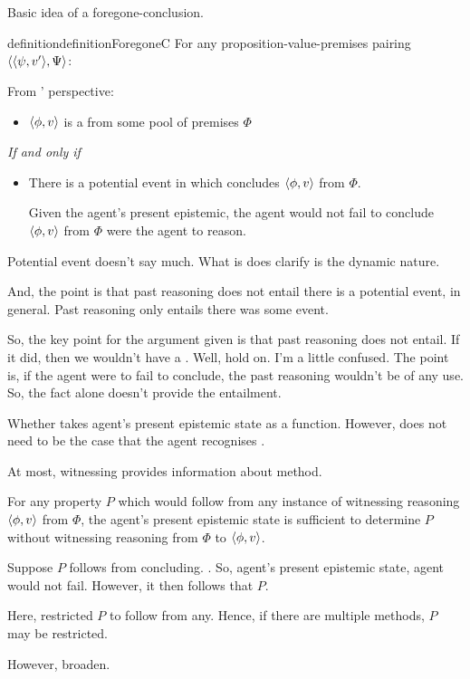 \section{}
\label{cha:fcs:sec:fc}

\begin{note}
  Basic idea of a foregone-conclusion.

  \begin{restatable}{definition}{definitionForegoneC}
    For any proposition-value-premises pairing \(\langle \langle \psi, v' \rangle, \Psi \rangle\):

    From \vAgent{}' perspective:
    \begin{itemize}
    \item
      \(\langle \phi, v \rangle\) is a \emph{} from some pool of premises \(\Phi\)
    \end{itemize}
    \emph{If and only if}
    \begin{itemize}
    \item
      There is a potential event in which \vAgent{} concludes \(\langle \phi, v \rangle\) from \(\Phi\).

      Given the agent's present epistemic, the agent would not fail to conclude \(\langle \phi, v \rangle\) from \(\Phi\) were the agent to reason.
    \end{itemize}
  \end{restatable}

  {
    Potential event doesn't say much.
    What is does clarify is the dynamic nature.

    And, the point is that past reasoning does not entail there is a potential event, in general.
    Past reasoning only entails there was some event.

    So, the key point for the argument given is that past reasoning does not entail.
    If it did, then we wouldn't have a \requ{}.
    Well, hold on.
    I'm a little confused.
    The point is, if the agent were to fail to conclude, the past reasoning wouldn't be of any use.
    So, the fact alone doesn't provide the entailment.
  }

  Whether \fc{} takes agent's present epistemic state as a function.
  However, does not need to be the case that the agent recognises \fc{}.

  At most, witnessing provides information about method.

  For any property \(P\) which would follow from any instance of witnessing reasoning \(\langle \phi, v \rangle\) from \(\Phi\), the agent's present epistemic state is sufficient to determine \(P\) without witnessing reasoning from \(\Phi\) to \(\langle \phi, v \rangle\).

  Suppose \(P\) follows from concluding.
  .
  So, agent's present epistemic state, agent would not fail.
  However, it then follows that \(P\).

  Here, restricted \(P\) to follow from any.
  Hence, if there are multiple methods, \(P\) may be restricted.

  However, broaden.
\end{note}

